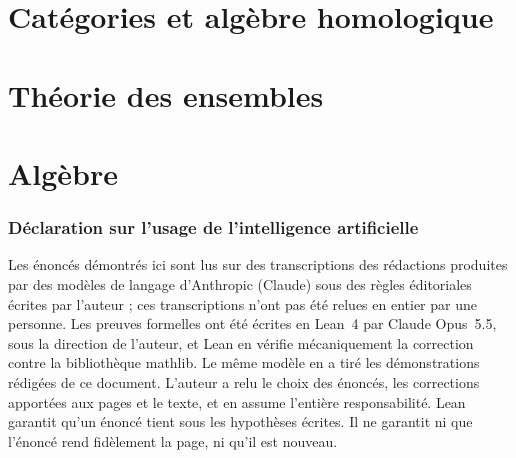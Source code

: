 \documentclass[11pt]{article}
\theoremstyle{plain}
\theoremstyle{definition}
\theoremstyle{plain}
\theoremstyle{definition}
\theoremstyle{remark}
\renewcommand{\_}{\bkunderscore\allowbreak}
\begin{document}
\part{Catégories et algèbre homologique}







\part{Théorie des ensembles}


\part{Algèbre}














\section*{Déclaration sur l'usage de l'intelligence artificielle}

Les énoncés démontrés ici sont lus sur des transcriptions des rédactions produites par des modèles de langage d'Anthropic (Claude) sous des règles éditoriales écrites par l'auteur ; ces transcriptions n'ont pas été relues en entier par une personne. Les preuves formelles ont été écrites en Lean~4 par Claude Opus~5.5, sous la direction de l'auteur, et Lean en vérifie mécaniquement la correction contre la bibliothèque mathlib. Le même modèle en a tiré les démonstrations rédigées de ce document. L'auteur a relu le choix des énoncés, les corrections apportées aux pages et le texte, et en assume l'entière responsabilité. Lean garantit qu'un énoncé tient sous les hypothèses écrites. Il ne garantit ni que l'énoncé rend fidèlement la page, ni qu'il est nouveau.
\end{document}
